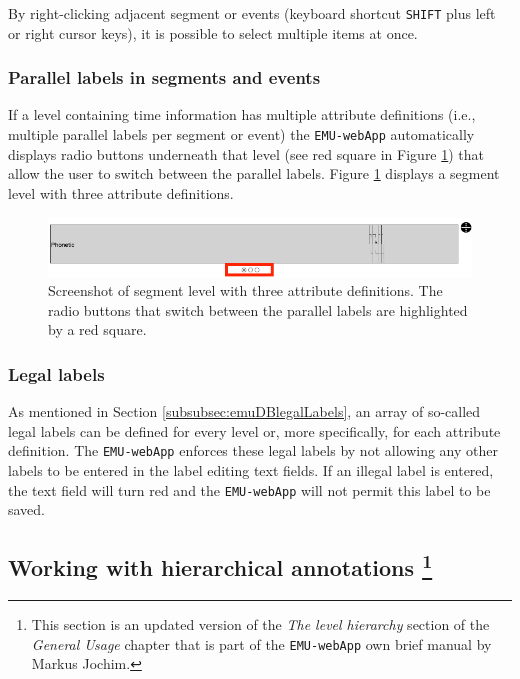 \documentclass[]{book}
\let\rmarkdownfootnote\footnote%
\def\footnote{\protect\rmarkdownfootnote}
\begin{document}
By right-clicking adjacent segment or events (keyboard shortcut \texttt{SHIFT} plus left or right cursor keys), it is possible to select multiple items at once.

\hypertarget{parallel-labels-in-segments-and-events}{%
\subsubsection{Parallel labels in segments and events}\label{parallel-labels-in-segments-and-events}}

If a level containing time information has multiple attribute definitions (i.e., multiple parallel labels per segment or event) the \texttt{EMU-webApp} automatically displays radio buttons underneath that level (see red square in Figure \ref{fig:webApp-parTimeLevel}) that allow the user to switch between the parallel labels. Figure \ref{fig:webApp-parTimeLevel} displays a segment level with three attribute definitions.

\begin{figure}

{\centering \includegraphics[width=0.75\linewidth]{pics/emu-webAppParTimeLevel} 

}

\caption{Screenshot of segment level with three attribute definitions. The radio buttons that switch between the parallel labels are highlighted by a red square.}\label{fig:webApp-parTimeLevel}
\end{figure}

\hypertarget{legal-labels}{%
\subsubsection{Legal labels}\label{legal-labels}}

As mentioned in Section \ref{subsubsec:emuDBlegalLabels}, an array of so-called legal labels can be defined for every level or, more specifically, for each attribute definition. The \texttt{EMU-webApp} enforces these legal labels by not allowing any other labels to be entered in the label editing text fields. If an illegal label is entered, the text field will turn red and the \texttt{EMU-webApp} will not permit this label to be saved.

\hypertarget{working-with-hierarchical-annotations-2-chapemu-webapp}{%
\subsection[Working with hierarchical annotations ]{\texorpdfstring{Working with hierarchical annotations \footnote{This section is an updated version of the \emph{The level hierarchy} section of the \emph{General Usage} chapter that is part of the \texttt{EMU-webApp} own brief manual by Markus Jochim.}}{Working with hierarchical annotations }}\label{working-with-hierarchical-annotations-2-chapemu-webapp}}
\end{document}
